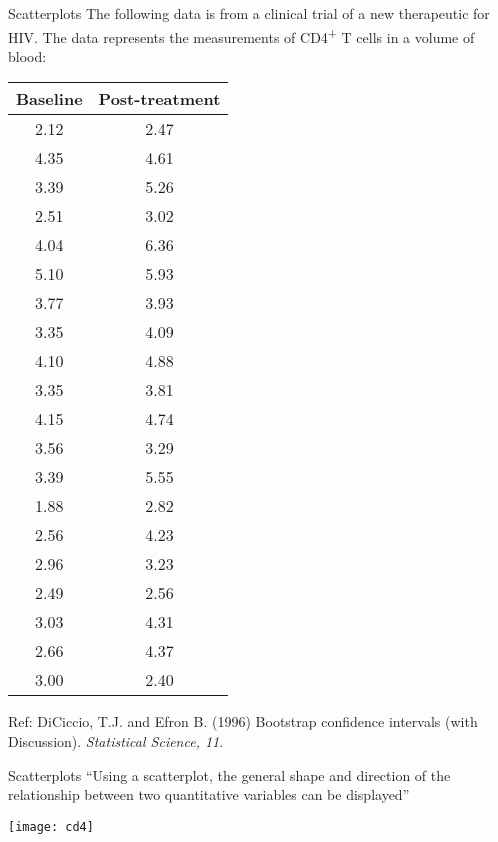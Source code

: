 \documentclass[xcolor=dvipsnames]{beamer}
\begin{document}
\begin{frame}{Scatterplots}
	The following data is from a clinical trial of a new therapeutic for HIV. The data represents the measurements of CD4\textsuperscript{+} T cells in a volume of blood:
	{\tiny
	\begin{center}
		\begin{tabular}{|c|c|}
			\hline
			   \textbf{Baseline} & \textbf{Post-treatment} \\ \hline \hline
			     2.12  &  2.47\\ \hline
			     4.35  & 4.61\\ \hline
			     3.39  &  5.26\\ \hline
			     2.51  & 3.02\\ \hline
			     4.04  &  6.36\\ \hline
			     5.10  &  5.93\\ \hline
			     3.77  &  3.93\\ \hline
			     3.35  &  4.09\\ \hline
			     4.10  &  4.88\\ \hline
			     3.35  &  3.81\\ \hline
			     4.15  &  4.74\\ \hline
			     3.56  &  3.29\\ \hline
			     3.39  &  5.55\\ \hline
			     1.88  &  2.82\\ \hline
			     2.56  &  4.23\\ \hline
			     2.96  &  3.23\\ \hline
			     2.49  &  2.56\\ \hline
			     3.03  &  4.31\\ \hline
			     2.66  &  4.37\\ \hline
			     3.00  &  2.40\\ \hline
		\end{tabular}
	\end{center}}
Ref: DiCiccio, T.J. and Efron B. (1996) Bootstrap confidence intervals (with Discussion). \emph{Statistical Science, 11}.
\end{frame}

\begin{frame}{Scatterplots}
``Using a scatterplot, the general shape and direction of the relationship between two quantitative variables can be displayed''
	\begin{center}
		\texttt{[image: cd4]}
	\end{center}
\end{frame}
\end{document}
